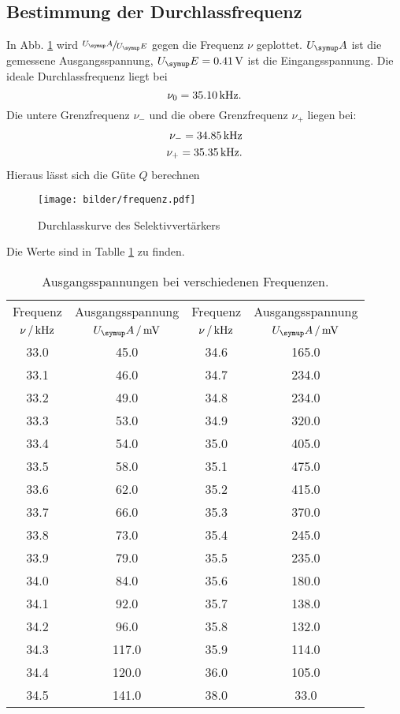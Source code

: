 \subsection{Bestimmung der Durchlassfrequenz}
In Abb. \ref{fig:Durchlass} wird $\sfrac{U_\su{A}}{U_\su{E}}$ gegen die Frequenz
$\nu$ geplottet. $U_\su{A}$ ist die gemessene Ausgangsspannung, $U_\su{E} = 0.41\,\si{\volt}$
ist die Eingangsspannung.
Die ideale Durchlassfrequenz liegt bei
\begin{equation}
  \nu_0 = 35.10 \,\si{\kilo\hertz}.
\end{equation}
Die untere Grenzfrequenz $\nu_-$ und die obere Grenzfrequenz $\nu_+$ liegen bei:
\begin{align}
  \nu_- = 34.85 \,\si{\kilo\hertz} \\
  \nu_+ = 35.35 \,\si{\kilo\hertz}.
\end{align}
Hieraus lässt sich die Güte $Q$ berechnen
\begin{figure}[H]
  \centering
  \texttt{[image: bilder/frequenz.pdf]}
  \caption{Durchlasskurve des Selektivvertärkers}
  \label{fig:Durchlass}
\end{figure}
\newpage
Die Werte sind in Tablle \ref{tab:werte} zu finden.
\begin{table}
  \centering
  \begin{tabular}{cc|cc}
    \toprule
    \multicolumn{1}{c}{Frequenz} & \multicolumn{1}{c|}{Ausgangsspannung} &
    \multicolumn{1}{c}{Frequenz} & \multicolumn{1}{c}{Ausgangsspannung} \\
    {$\nu\,/\,\si{\kilo\hertz}$} & {$U_\su{A}\,/\mV$}& {$\nu\,/\,\si{\kilo\hertz}$} & {$U_\su{A}\,/\mV$} \\
    \midrule
       33.0 &   45.0 & 34.6  &   165.0 \\
       33.1 &   46.0 & 34.7  &   234.0 \\
       33.2 &   49.0 & 34.8  &   234.0 \\
       33.3 &   53.0 & 34.9  &   320.0 \\
       33.4 &   54.0 & 35.0  &   405.0 \\
       33.5 &   58.0 & 35.1  &   475.0 \\
       33.6 &   62.0 & 35.2  &   415.0 \\
       33.7 &   66.0 & 35.3  &   370.0 \\
       33.8 &   73.0 & 35.4  &   245.0 \\
       33.9 &   79.0 & 35.5  &   235.0 \\
       34.0 &   84.0 & 35.6  &   180.0 \\
       34.1 &   92.0 & 35.7  &   138.0 \\
       34.2 &   96.0 & 35.8  &   132.0 \\
       34.3 &  117.0 & 35.9  &   114.0 \\
       34.4 &  120.0 & 36.0  &   105.0 \\
       34.5 &  141.0 & 38.0  &    33.0 \\
  \bottomrule
  \end{tabular}
  \caption{Ausgangsspannungen bei verschiedenen Frequenzen.}
  \label{tab:werte}
\end{table}
\newpage
